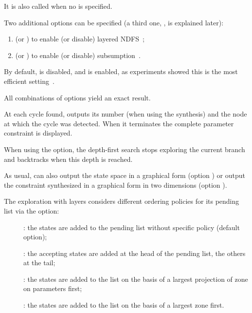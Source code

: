 It is also called when no  is specified.

Two additional options can be specified (a third one, , is explained later):
\begin{enumerate}
	\item {} (or ) to enable (or disable) layered NDFS~\cite{NPP18};
	\item {} (or ) to enable (or disable) subsumption~\cite{NPP18}.
\end{enumerate}
By default,  is disabled, and  is enabled, as experiments showed this is the most efficient setting~\cite{NPP18}.

All combinations of options yield an exact result.




At each cycle found, \imitator{} outputs its number (when using the synthesis) and
the node at which the cycle was detected. When it terminates the complete parameter
constraint is displayed.


When using the  option, the depth-first search stops exploring
the current branch and backtracks when this depth is reached.


As usual, \imitator{} can also
output the state space in a graphical form (option )
or
output the constraint synthesized in a graphical form in two dimensions (option ).

The exploration with layers considers different ordering policies for its pending
list via the  option:
\begin{description}
	\item[]: the states are added to the pending list
	      without specific policy	(default option);
	\item[]: the accepting states are added at
	      the head of the pending list, the others at the tail;
	\item[]: the states are added to the list on
	      the basis of a largest projection of zone on parameters first;
	\item[]: the states are added to the list on
	      the basis of a largest zone first.
\end{description}


